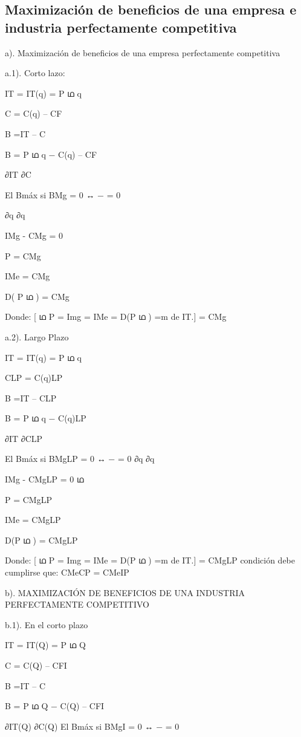 \documentclass[
  letterpaper,
  DIV=11,
  numbers=noendperiod]{scrartcl}
\begin{document}
\hypertarget{maximizaciuxf3n-de-beneficios-de-una-empresa-e-industria-perfectamente-competitiva}{%
\subsection{Maximización de beneficios de una empresa e industria
perfectamente
competitiva}\label{maximizaciuxf3n-de-beneficios-de-una-empresa-e-industria-perfectamente-competitiva}}

a). Maximización de beneficios de una empresa perfectamente competitiva

a.1). Corto lazo:

IT = IT(q) = P ഥ q

C = C(q) -- CF

B =IT -- C

B = P ഥ q − C(q) -- CF

∂IT ∂C

El Bmáx si BMg = 0 ↔ − = 0

∂q ∂q

IMg - CMg = 0

P = CMg

IMe = CMg

D( P ഥ ) = CMg

Donde: {[} ഥ P = Img = IMe = D(P ഥ ) =m de IT.{]} = CMg

a.2). Largo Plazo

IT = IT(q) = P ഥ q

CLP = C(q)LP

B =IT -- CLP

B = P ഥ q − C(q)LP

∂IT ∂CLP

El Bmáx si BMgLP = 0 ↔ − = 0 ∂q ∂q

IMg - CMgLP = 0 ഥ

P = CMgLP

IMe = CMgLP

D(P ഥ ) = CMgLP

Donde: {[} ഥ P = Img = IMe = D(P ഥ ) =m de IT.{]} = CMgLP condición debe
cumplirse que: CMeCP = CMeIP

b). MAXIMIZACIÓN DE BENEFICIOS DE UNA INDUSTRIA PERFECTAMENTE
COMPETITIVO

b.1). En el corto plazo

IT = IT(Q) = P ഥ Q

C = C(Q) -- CFI

B =IT -- C

B = P ഥ Q − C(Q) -- CFI

∂IT(Q) ∂C(Q) El Bmáx si BMgI = 0 ↔ − = 0
\end{document}
